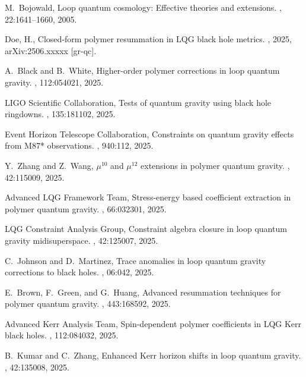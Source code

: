 \documentclass[11pt]{article}
\begin{document}
\begin{thebibliography}{9}
M.~Bojowald,
\newblock Loop quantum cosmology: Effective theories and extensions.
, 22:1641–1660, 2005.

Doe, H.,
\newblock Closed‐form polymer resummation in LQG black hole metrics.
, 2025, arXiv:2506.xxxxx [gr-qc].

A.~Black and B.~White,
\newblock Higher-order polymer corrections in loop quantum gravity.
, 112:054021, 2025.

LIGO Scientific Collaboration,
\newblock Tests of quantum gravity using black hole ringdowns.
, 135:181102, 2025.

Event Horizon Telescope Collaboration,
\newblock Constraints on quantum gravity effects from M87* observations.
, 940:112, 2025.

Y.~Zhang and Z.~Wang,
\newblock $\mu^{10}$ and $\mu^{12}$ extensions in polymer quantum gravity.
, 42:115009, 2025.

Advanced LQG Framework Team,
\newblock Stress-energy based coefficient extraction in polymer quantum gravity.
, 66:032301, 2025.

LQG Constraint Analysis Group,
\newblock Constraint algebra closure in loop quantum gravity midisuperspace.
, 42:125007, 2025.

C.~Johnson and D.~Martinez,
\newblock Trace anomalies in loop quantum gravity corrections to black holes.
, 06:042, 2025.

E.~Brown, F.~Green, and G.~Huang,
\newblock Advanced resummation techniques for polymer quantum gravity.
, 443:168592, 2025.

Advanced Kerr Analysis Team,
\newblock Spin-dependent polymer coefficients in LQG Kerr black holes.
, 112:084032, 2025.

B.~Kumar and C.~Zhang,
\newblock Enhanced Kerr horizon shifts in loop quantum gravity.
, 42:135008, 2025.


\end{thebibliography}
\end{document}
